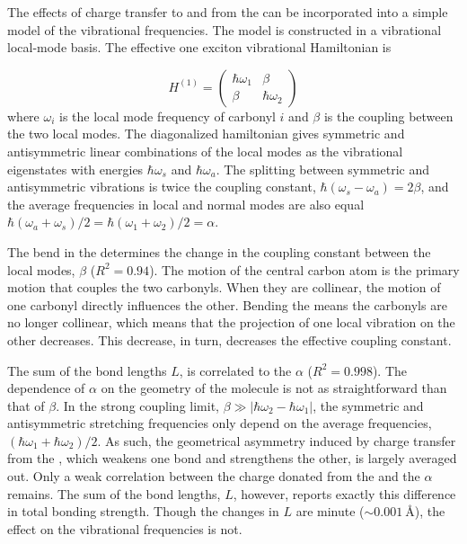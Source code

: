 \documentclass[%
  class = book,%
  crop = false,%
  float = true,%
  multi = true,%
  preview = false,%
]{standalone}
\begin{document}
{The effects of charge transfer to and from the  can be incorporated into a simple model of the vibrational frequencies. The model is constructed in a vibrational local-mode basis. The effective one exciton vibrational Hamiltonian is

\begin{equation}
  H^{(1)} =
  \begin{pmatrix}
    \hbar\omega_1 & \beta\\
    \beta & \hbar\omega_2
  \end{pmatrix}
\end{equation}
where \(\omega_i\) is the local mode frequency of carbonyl \(i\) and \(\beta\) is the coupling between the two local modes. The diagonalized hamiltonian gives symmetric and antisymmetric linear combinations of the local modes as the vibrational eigenstates with energies \(\hbar\omega_s\) and \(\hbar\omega_a\). The splitting between symmetric and antisymmetric vibrations is twice the coupling constant, \(\hbar(\omega_s - \omega_a) = 2\beta\), and the average frequencies in local and normal modes are also equal \(\hbar(\omega_a + \omega_s)/2 = \hbar(\omega_1 + \omega_2)/2 = \alpha\).

The bend in the  determines the change in the coupling constant between the local modes, \(\beta\) (\(R^2 = 0.94\)). The motion of the central carbon atom is the primary motion that couples the two carbonyls. When they are collinear, the motion of one carbonyl directly influences the other. Bending the  means the carbonyls are no longer collinear, which means that the projection of one local vibration on the other decreases. This decrease, in turn, decreases the effective coupling constant.

The sum of the  bond lengths \(L\), is correlated to the \(\alpha\) (\(R^2 = 0.998\)). The dependence of \(\alpha\) on the geometry of the molecule is not as straightforward than that of \(\beta\). In the strong coupling limit, \(\beta \gg |\hbar\omega_2-\hbar\omega_1|\), the symmetric and antisymmetric stretching frequencies only depend on the average frequencies, \((\hbar\omega_1 + \hbar\omega_2)/2\). As such, the geometrical asymmetry induced by charge transfer from the , which weakens one bond and strengthens the other, is largely averaged out. Only a weak correlation between the charge donated from the  and the \(\alpha\) remains. The sum of the bond lengths, \(L\), however, reports exactly this difference in total bonding strength. Though the changes in \(L\) are minute (\(\sim \SI{0.001}{\angstrom}\)), the effect on the vibrational frequencies is not.

}
\end{document}
